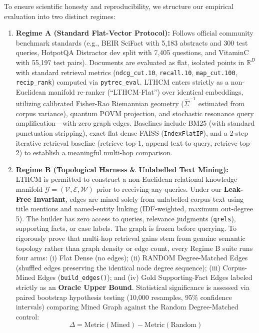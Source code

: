 \documentclass[11pt,a4paper]{article}
\begin{document}
To ensure scientific honesty and reproducibility, we structure our empirical evaluation into two distinct regimes:
\begin{enumerate}
    \item \textbf{Regime A (Standard Flat-Vector Protocol):} Follows official community benchmark standards (e.g., BEIR SciFact with 5,183 abstracts and 300 test queries, HotpotQA Distractor dev split with 7,405 questions, and VitaminC with 55,197 test pairs). Documents are evaluated as flat, isolated points in $\mathbb{R}^D$ with standard retrieval metrics (\texttt{ndcg\_cut.10}, \texttt{recall.10}, \texttt{map\_cut.100}, \texttt{recip\_rank}) computed via \texttt{pytrec\_eval}. LTHCM enters strictly as a non-Euclidean manifold re-ranker (``LTHCM-Flat'') over identical embeddings, utilizing calibrated Fisher-Rao Riemannian geometry ($\hat{\Sigma}^{-1}$ estimated from corpus variance), quantum POVM projection, and stochastic resonance query amplification---with zero graph edges. Baselines include BM25 (with standard punctuation stripping), exact flat dense FAISS (\texttt{IndexFlatIP}), and a 2-step iterative retrieval baseline (retrieve top-1, append text to query, retrieve top-2) to establish a meaningful multi-hop comparison.
    \item \textbf{Regime B (Topological Harness \& Unlabelled Text Mining):} LTHCM is permitted to construct a non-Euclidean relational knowledge manifold $\mathcal{G} = (\mathcal{V}, \mathcal{E}, \mathcal{W})$ prior to receiving any queries. Under our \textbf{Leak-Free Invariant}, edges are mined solely from unlabelled corpus text using title mentions and named-entity linking (IDF-weighted, maximum out-degree 5). The builder has zero access to queries, relevance judgments (\texttt{qrels}), supporting facts, or case labels. The graph is frozen before querying. To rigorously prove that multi-hop retrieval gains stem from genuine semantic topology rather than graph density or edge count, every Regime B suite runs four arms: (i) Flat Dense (no edges); (ii) RANDOM Degree-Matched Edges (shuffled edges preserving the identical node degree sequence); (iii) Corpus-Mined Edges (\texttt{build\_edges()}); and (iv) Gold Supporting-Fact Edges labeled strictly as an \textbf{Oracle Upper Bound}. Statistical significance is assessed via paired bootstrap hypothesis testing (10,000 resamples, 95\% confidence intervals) comparing Mined Graph against the Random Degree-Matched control:
    \begin{equation}
        \Delta = \mathrm{Metric}(\text{Mined}) - \mathrm{Metric}(\text{Random})
    \end{equation}
\end{enumerate}
\end{document}
